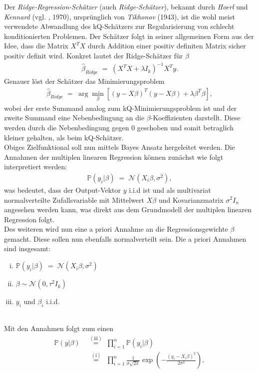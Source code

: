 Der \textit{Ridge-Regression-Schätzer} (auch \textit{Ridge-Schätzer}), bekannt durch \textit{Hoerl} und \textit{Kennard} (vgl. \cite{Ridge}, 1970), ursprünglich von \textit{Tikhonov} (1943), ist die wohl meist verwendete Abwandlung des kQ-Schätzers zur Regularisierung von schlecht konditionierten Problemen. Der Schätzer folgt in seiner allgemeinen Form aus der Idee, dass die Matrix \(X^TX\) durch Addition einer positiv definiten Matrix sicher positiv definit wird. Konkret lautet der Ridge-Schätzer für \(\beta\)
\begin{align*}
	\hat{\beta}_{Ridge}\;=\;\left(X^TX+\lambda I_k\right)^{-1}X^Ty.
\end{align*}
Genauer löst der Schätzer das Minimierungsproblem
\begin{align*}
	\hat{\beta}_{Ridge}\;=\;\arg\underset{\beta}{\min}\left[\left(y-X\beta\right)^T\left(y-X\beta\right)+\lambda\beta^T\beta\right],
\end{align*}
wobei der erste Summand analog zum kQ-Minimierungsproblem ist und der zweite Summand eine Nebenbedingung an die \(\beta\)-Koeffizienten darstellt. Diese werden durch die Nebenbedingung gegen 0 geschoben und somit betraglich kleiner gehalten, als beim kQ-Schätzer.\\
Obiges Zielfunktional soll nun mittels Bayes Ansatz hergeleitet werden. Die  Annahmen der multiplen linearen Regression können zunächst wie folgt interpretiert werden:
\begin{align*}
	\mathbb{P}(y_i\vert \beta)\;=\;\mathcal{N}(X_i\beta,\sigma^2),
\end{align*}
was bedeutet, dass der Output-Vektor \(y\) i.i.d ist und als multivariat normalverteilte Zufallsvariable mit Mittelwert \(X\beta\) und Kovarianzmatrix \(\sigma^2I_n\) angesehen werden kann, was direkt aus dem Grundmodell der multiplen linearen Regression folgt.\\
Des weiteren wird nun eine a priori Annahme an die Regressionsgewichte \(\beta\) gemacht. Diese sollen nun ebenfalls normalverteilt sein. Die a priori Annahmen sind insgesamt:
\begin{enumerate}[(i)]
	\item \(\mathbb{P}(y_i\vert \beta)\;=\;\mathcal{N}(X_i\beta,\sigma^2)\)
	\item \(\beta\sim \mathcal{N}(0, \tau^2 I_k)\)
	\item \(y_i\) und \(\beta_i\) i.i.d.
\end{enumerate}
\hfill\\Mit den Annahmen folgt zum einen
\begin{align*}
	\mathbb{P}(y|\beta)&\;\overset{(\text{iii})}{=}\;\prod_{i=1}^{n}\mathbb{P}(y_i|\beta)\\
	&\;\:\overset{(\text{i})}{=}\:\:\prod_{i=1}^{n}\frac{1}{\sigma\sqrt{2\pi}}\exp\left(-\frac{\left(y_i-X_i\beta\right)^2}{2\sigma^2}\right),
\end{align*}
